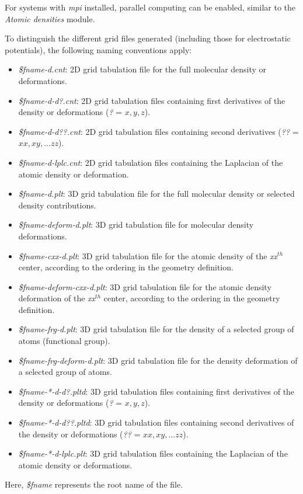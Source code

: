\documentclass[10pt]{article}
\begin{document}
For systems with {\it mpi} installed, parallel computing can be enabled,
similar to the {\it Atomic densities} module.

To distinguish the different grid files generated (including those for electrostatic potentials),
the following naming conventions apply:

\begin{itemize}
\item {\it \$fname-d.cnt}: 2D grid tabulation file for the full molecular density or deformations.
\item {\it \$fname-d-d?.cnt}: 2D grid tabulation files containing first derivatives of the density or deformations ({\it ?} = $x, y, z$).
\item {\it \$fname-d-d??.cnt}: 2D grid tabulation files containing second derivatives ({\it ??} = $xx, xy, ... zz$).
\item {\it \$fname-d-lplc.cnt}: 2D grid tabulation files containing the Laplacian of the atomic density or deformation.
\item {\it \$fname-d.plt}: 3D grid tabulation file for the full molecular density or selected density contributions.
\item {\it \$fname-deform-d.plt}: 3D grid tabulation file for molecular density deformations.
\item {\it \$fname-cxx-d.plt}: 3D grid tabulation file for the atomic density of the {\it xx$^{th}$} center,
according to the ordering in the geometry definition.
\item {\it \$fname-deform-cxx-d.plt}: 3D grid tabulation file for the atomic density deformation
of the {\it xx$^{th}$} center, according to the ordering in the geometry definition.
\item {\it \$fname-frg-d.plt}: 3D grid tabulation file for the density of a selected group of atoms (functional group).
\item {\it \$fname-frg-deform-d.plt}: 3D grid tabulation file for the density deformation of a selected group of atoms.
\item {\it \$fname-*-d-d?.pltd}: 3D grid tabulation files containing first derivatives of the density or deformations ({\it ?} = $x, y, z$).
\item {\it \$fname-*-d-d??.pltd}: 3D grid tabulation files containing second derivatives of the density or deformations ({\it ??} = $xx, xy, ... zz$).
\item {\it \$fname-*-d-lplc.plt}: 3D grid tabulation files containing the Laplacian of the atomic density or deformations.
\end{itemize}
%
Here, {\it \$fname} represents the root name of the file.
\end{document}
